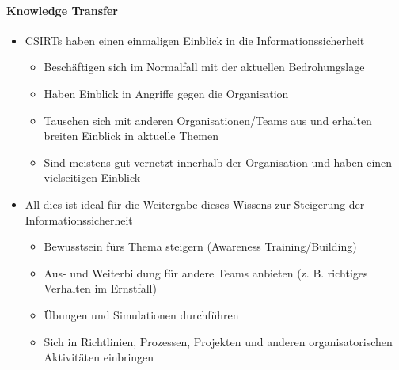 \paragraph{Knowledge Transfer}
\begin{itemize}
    \item CSIRTs haben einen einmaligen Einblick in die Informationssicherheit
    \begin{itemize}
        \item Beschäftigen sich im Normalfall mit der aktuellen Bedrohungslage
        \item Haben Einblick in Angriffe gegen die Organisation
        \item Tauschen sich mit anderen Organisationen/Teams aus und erhalten breiten Einblick in aktuelle Themen
        \item Sind meistens gut vernetzt innerhalb der Organisation und haben einen vielseitigen Einblick
    \end{itemize}
    \item All dies ist ideal für die Weitergabe dieses Wissens zur Steigerung der Informationssicherheit
    \begin{itemize}
        \item Bewusstsein fürs Thema steigern (Awareness Training/Building)
        \item Aus- und Weiterbildung für andere Teams anbieten (z. B. richtiges Verhalten im Ernstfall)
        \item Übungen und Simulationen durchführen
        \item Sich in Richtlinien, Prozessen, Projekten und anderen organisatorischen Aktivitäten einbringen
    \end{itemize}
\end{itemize}

